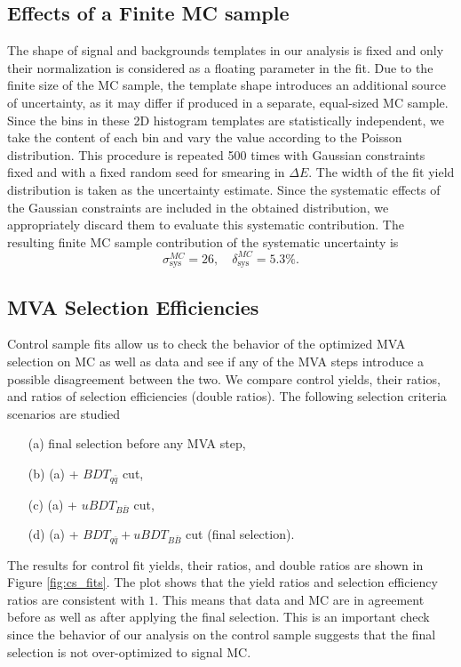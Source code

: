 \subsection{Effects of a Finite MC sample}
The shape of signal and backgrounds templates in our analysis is fixed and only their normalization is considered as a floating parameter in the fit. Due to the finite size of the MC sample, the template shape introduces an additional source of uncertainty, as it may differ if produced in a separate, equal-sized MC sample. Since the bins in these 2D histogram templates are statistically independent, we take the content of each bin and vary the value according to the Poisson distribution. This procedure is repeated 500 times with Gaussian constraints fixed and with a fixed random seed for smearing in $\Delta E$. The width of the fit yield distribution is taken as the uncertainty estimate. Since the systematic effects of the Gaussian constraints are included in the obtained distribution, we appropriately discard them to evaluate this systematic contribution. The resulting finite MC sample contribution of the systematic uncertainty is
\begin{equation}
\sigma_{\mathrm{sys}}^{MC} = 26,\quad \delta_{\mathrm{sys}}^{MC} = 5.3\%.
\end{equation}


\subsection{MVA Selection Efficiencies}
Control sample fits allow us to check the behavior of the optimized MVA selection on MC as well as data and see if any of the MVA steps introduce a possible disagreement between the two. We compare control yields, their ratios, and ratios of selection efficiencies (double ratios). The following selection criteria scenarios are studied
\begin{itemize}
	\item[(a)] final selection before any MVA step,
	\item[(b)] (a) + $BDT_{q\bar q}$ cut,
	\item[(c)] (a) + $uBDT_{B\bar B}$ cut,
	\item[(d)] (a) + $BDT_{q\bar q} + uBDT_{B\bar B}$ cut (final selection).
\end{itemize}

The results for control fit yields, their ratios, and double ratios are shown in Figure \ref{fig:cs_fits}. The plot shows that the yield ratios and selection efficiency ratios are consistent with $1$. This means that data and MC are in agreement before as well as after applying the final selection. This is an important check since the behavior of our analysis on the control sample suggests that the final selection is not over-optimized to signal MC.

